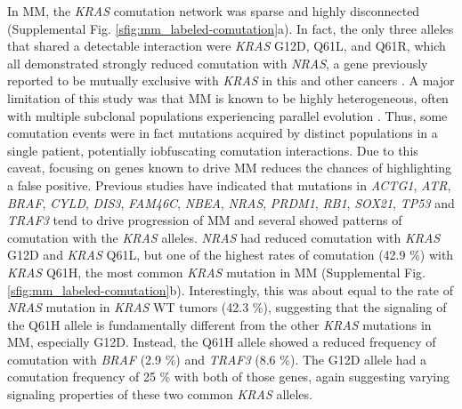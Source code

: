 \documentclass[english, 12pt, letterpaper]{article}
\newcommand{\KRAS}{\emph{KRAS}}
\begin{document}
In MM, the \KRAS{} comutation network was sparse and highly disconnected (Supplemental Fig. \ref{sfig:mm_labeled-comutation}a).
In fact, the only three alleles that shared a detectable interaction were \KRAS{} G12D, Q61L, and Q61R, which all demonstrated strongly reduced comutation with \emph{NRAS}, a gene previously reported to be mutually exclusive with \KRAS{} in this and other cancers \cite{Lohr2014WidespreadTherapy.}.
A major limitation of this study was that MM is known to be highly heterogeneous, often with multiple subclonal populations experiencing parallel evolution \cite{Melchor2014Single-cellMyeloma., Lionetti2015MolecularActivation., Keats2012ClonalMyeloma., Corre2015GeneticsLevel, Lohr2016GeneticResolution., Lohr2014WidespreadTherapy., Xu2017MolecularActivation.}.
Thus, some comutation events were in fact mutations acquired by distinct populations in a single patient, potentially iobfuscating comutation interactions.
Due to this caveat, focusing on genes known to drive MM reduces the chances of highlighting a false positive. 
Previous studies have indicated that mutations in \emph{ACTG1}, \emph{ATR}, \emph{BRAF}, \emph{CYLD}, \emph{DIS3}, \emph{FAM46C}, \emph{NBEA}, \emph{NRAS}, \emph{PRDM1}, \emph{RB1}, \emph{SOX21}, \emph{TP53} and \emph{TRAF3} tend to drive progression of MM \cite{Lohr2014WidespreadTherapy., Sondka2018} and several showed patterns of comutation with the \KRAS{} alleles.
\emph{NRAS} had reduced comutation with \KRAS{} G12D and \KRAS{} Q61L, but one of the highest rates of comutation (42.9 \%) with \KRAS{} Q61H, the most common \KRAS{} mutation in MM (Supplemental Fig. \ref{sfig:mm_labeled-comutation}b).
Interestingly, this was about equal to the rate of \emph{NRAS} mutation in \KRAS{} WT tumors (42.3 \%), suggesting that the signaling of the Q61H allele is fundamentally different from the other \KRAS{} mutations in MM, especially G12D.
Instead, the Q61H allele showed a reduced frequency of comutation with \emph{BRAF} (2.9 \%) and \emph{TRAF3} (8.6 \%).
The G12D allele had a comutation frequency of 25 \% with both of those genes, again suggesting varying signaling properties of these two common \KRAS{} alleles.
\end{document}
